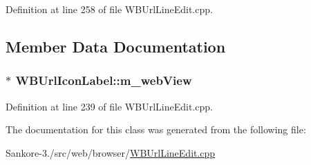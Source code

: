 Definition at line 258 of file W\-B\-Url\-Line\-Edit.\-cpp.



\subsection{Member Data Documentation}
\hypertarget{class_w_b_url_icon_label_a355a9c9777d749ef3e43a28202d32dd4}{
\subsubsection[{m\-\_\-web\-View}]{$\ast$ W\-B\-Url\-Icon\-Label\-::m\-\_\-web\-View}}\label{d3/d3f/class_w_b_url_icon_label_a355a9c9777d749ef3e43a28202d32dd4}


Definition at line 239 of file W\-B\-Url\-Line\-Edit.\-cpp.



The documentation for this class was generated from the following file\-:\begin{DoxyCompactItemize}
\item 
Sankore-\/3./src/web/browser/\hyperlink{_w_b_url_line_edit_8cpp}{W\-B\-Url\-Line\-Edit.\-cpp}\end{DoxyCompactItemize}

